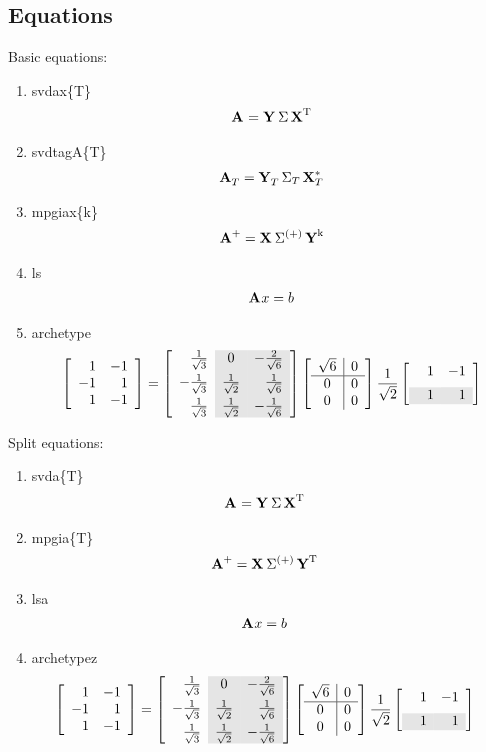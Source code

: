 \subsection{Equations}
Basic equations:
\begin{enumerate}
\item svdax\{T\}
\begin{equation}
  \begin{split}
    \svdax{T}
  \end{split}
\end{equation}
\item svdtagA\{T\}
\begin{equation}
  \begin{split}
    \svdtagA{T}
  \end{split}
\end{equation}
\item mpgiax\{k\}
\begin{equation}
  \begin{split}
    \mpgiax{k}
  \end{split}
\end{equation}
\item ls
\begin{equation}
  \begin{split}
    \ls
  \end{split}
\end{equation}
\item archetype
\begin{equation}
  \begin{split}
    \archetype
  \end{split}
\end{equation}
\end{enumerate}


Split equations:
\begin{enumerate}
\item svda\{T\}
\begin{equation}
  \begin{split}
    \svda{T}
  \end{split}
\end{equation}
\item mpgia\{T\}
\begin{equation}
  \begin{split}
    \mpgia{T}
  \end{split}
\end{equation}
\item lsa
\begin{equation}
  \begin{split}
    \lsa
  \end{split}
\end{equation}
\item archetypez
\begin{equation}
  \begin{split}
    \archetypez
  \end{split}
\end{equation}
\end{enumerate}

